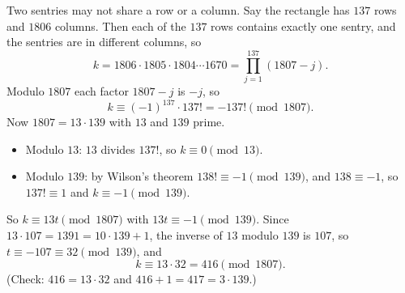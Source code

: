 Two sentries may not share a row or a column. Say the rectangle has $137$ rows and $1806$ columns. Then each of the $137$ rows contains exactly one sentry, and the sentries are in different columns, so
\[k=1806\cdot1805\cdot1804\cdots1670=\prod_{j=1}^{137}(1807-j).\]
Modulo $1807$ each factor $1807-j$ is $-j$, so
\[k\equiv(-1)^{137}\cdot137!=-137!\pmod{1807}.\]
Now $1807=13\cdot139$ with $13$ and $139$ prime.
\begin{itemize}
\item Modulo $13$: $13$ divides $137!$, so $k\equiv0\pmod{13}$.
\item Modulo $139$: by Wilson's theorem $138!\equiv-1\pmod{139}$, and $138\equiv-1$, so $137!\equiv1$ and $k\equiv-1\pmod{139}$.
\end{itemize}
So $k\equiv13t\pmod{1807}$ with $13t\equiv-1\pmod{139}$. Since $13\cdot107=1391=10\cdot139+1$, the inverse of $13$ modulo $139$ is $107$, so $t\equiv-107\equiv32\pmod{139}$, and
\[k\equiv13\cdot32=\boxed{416}\pmod{1807}.\]
(Check: $416=13\cdot32$ and $416+1=417=3\cdot139$.)

